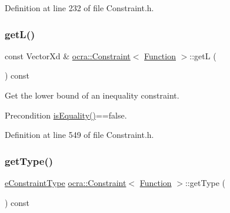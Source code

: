 Definition at line 232 of file Constraint.\+h.

\hypertarget{classocra_1_1Constraint_3_01Function_01_4_a9539f6914fb118de1352f7558c3cb203}{}\label{classocra_1_1Constraint_3_01Function_01_4_a9539f6914fb118de1352f7558c3cb203} 
\subsubsection{\texorpdfstring{get\+L()}{getL()}}
{\footnotesize\ttfamily const Vector\+Xd \& \hyperlink{classocra_1_1Constraint}{ocra\+::\+Constraint}$<$ \hyperlink{classocra_1_1Function}{Function} $>$\+::getL (\begin{DoxyParamCaption}{ }\end{DoxyParamCaption}) const\hspace{0.3cm}{\ttfamily [inline]}}

Get the lower bound of an inequality constraint.

\begin{DoxyPrecond}{Precondition}
\hyperlink{classocra_1_1Constraint_3_01Function_01_4_a3c7d085d888ef8937977129740d4c8a6}{is\+Equality()}==false. 
\end{DoxyPrecond}


Definition at line 549 of file Constraint.\+h.

\hypertarget{classocra_1_1Constraint_3_01Function_01_4_a05ee69ff17396c36c12dc6df6c7cc12e}{}\label{classocra_1_1Constraint_3_01Function_01_4_a05ee69ff17396c36c12dc6df6c7cc12e} 
\subsubsection{\texorpdfstring{get\+Type()}{getType()}}
{\footnotesize\ttfamily \hyperlink{namespaceocra_aedff92662043a7f15dc263363db7939b}{e\+Constraint\+Type} \hyperlink{classocra_1_1Constraint}{ocra\+::\+Constraint}$<$ \hyperlink{classocra_1_1Function}{Function} $>$\+::get\+Type (\begin{DoxyParamCaption}{ }\end{DoxyParamCaption}) const\hspace{0.3cm}{\ttfamily [inline]}}

